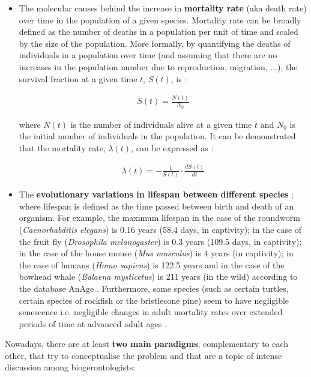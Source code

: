 \begin{itemize}
	
	\item The molecular causes behind the increase in \textbf{mortality rate} (aka death rate) over time in the population of a given species. Mortality rate can be broadly defined as the number of deaths in a population per unit of time and scaled by the size of the population. More formally, by quantifying the deaths of individuals in a population over time (and assuming that there are no increases in the population number due to reproduction, migration, ...), the survival fraction at a given time $t$, $S(t)$, is \cite{Witten1986}:
	
	\begin{align} \label{eq:1.1}
	S(t) = \frac{N(t)}{N_0}
	\end{align}
	
	where $N(t)$ is the number of individuals alive at a given time $t$ and $N_0$ is the initial number of individuals in the population. It can be demonstrated that the mortality rate, $\lambda(t)$, can be expressed as \cite{Witten1986}:
	
	\begin{align} \label{eq:1.2}
	\lambda(t) = - \frac{1}{S(t)} \cdot \frac{dS(t)}{dt}
	\end{align}
	
	\item The \textbf{evolutionary variations in lifespan between different species} \cite{Jones2013}; where lifespan is defined as the time passed between birth and death of an organism. For example, the maximum lifespan in the case of the roundworm (\textit{Caenorhabditis elegans}) is 0.16 years (58.4 days, in captivity); in the case of the fruit fly (\textit{Drosophila melanogaster}) is 0.3 years (109.5 days, in captivity); in the case of the house mouse (\textit{Mus musculus}) is 4 years (in captivity); in the case of humans (\textit{Homo sapiens}) is 122.5 years and in the case of the bowhead whale (\textit{Balaena mysticetus}) is 211 years (in the wild) according to the database AnAge \cite{DEMAGALHAES2009}. Furthermore, some species (such as certain turtles, certain species of rockfish or the bristlecone pine) seem to have negligible senescence i.e. negligible changes in adult mortality rates over extended periods of time at advanced adult ages \cite{Finch2009}.   
	
\end{itemize}

Nowadays, there are at least \textbf{two main paradigms}, complementary to each other, that try to conceptualise the problem and that are a topic of intense discussion among biogerontologists:

